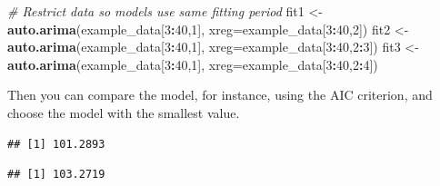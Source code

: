 \documentclass[
]{article}
\newenvironment{Shaded}{\begin{snugshade}}{\end{snugshade}}
\newcommand{\CommentTok}[1]{\textcolor[rgb]{0.56,0.35,0.01}{\textit{#1}}}
\newcommand{\DataTypeTok}[1]{\textcolor[rgb]{0.13,0.29,0.53}{#1}}
\newcommand{\DecValTok}[1]{\textcolor[rgb]{0.00,0.00,0.81}{#1}}
\newcommand{\KeywordTok}[1]{\textcolor[rgb]{0.13,0.29,0.53}{\textbf{#1}}}
\newcommand{\NormalTok}[1]{#1}
\newcommand{\OperatorTok}[1]{\textcolor[rgb]{0.81,0.36,0.00}{\textbf{#1}}}
\newcommand{\StringTok}[1]{\textcolor[rgb]{0.31,0.60,0.02}{#1}}
\begin{document}
\begin{Shaded}
\begin{Highlighting}[]
\CommentTok{# Restrict data so models use same fitting period}
\NormalTok{fit1 <-}\StringTok{ }\KeywordTok{auto.arima}\NormalTok{(example_data[}\DecValTok{3}\OperatorTok{:}\DecValTok{40}\NormalTok{,}\DecValTok{1}\NormalTok{], }\DataTypeTok{xreg=}\NormalTok{example_data[}\DecValTok{3}\OperatorTok{:}\DecValTok{40}\NormalTok{,}\DecValTok{2}\NormalTok{])}
\NormalTok{fit2 <-}\StringTok{ }\KeywordTok{auto.arima}\NormalTok{(example_data[}\DecValTok{3}\OperatorTok{:}\DecValTok{40}\NormalTok{,}\DecValTok{1}\NormalTok{], }\DataTypeTok{xreg=}\NormalTok{example_data[}\DecValTok{3}\OperatorTok{:}\DecValTok{40}\NormalTok{,}\DecValTok{2}\OperatorTok{:}\DecValTok{3}\NormalTok{])}
\NormalTok{fit3 <-}\StringTok{ }\KeywordTok{auto.arima}\NormalTok{(example_data[}\DecValTok{3}\OperatorTok{:}\DecValTok{40}\NormalTok{,}\DecValTok{1}\NormalTok{], }\DataTypeTok{xreg=}\NormalTok{example_data[}\DecValTok{3}\OperatorTok{:}\DecValTok{40}\NormalTok{,}\DecValTok{2}\OperatorTok{:}\DecValTok{4}\NormalTok{])}
\end{Highlighting}
\end{Shaded}

Then you can compare the model, for instance, using the AIC criterion, and choose the model with the smallest value.

\begin{Shaded}
\end{Shaded}

\begin{verbatim}
## [1] 101.2893
\end{verbatim}

\begin{Shaded}
\end{Shaded}

\begin{verbatim}
## [1] 103.2719
\end{verbatim}

\begin{Shaded}
\end{Shaded}
\end{document}
